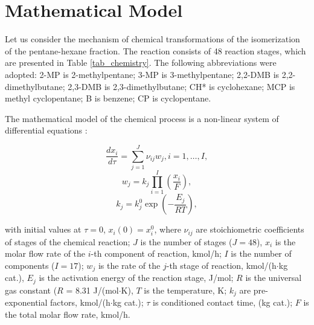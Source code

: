 \documentclass[mathematics,article,accept,pdftex,moreauthors]{Definitions/mdpi}
\begin{document}
	\section{Mathematical Model}\label{sec_matmodel}
	
	Let us consider the mechanism of chemical transformations of the isomerization of the pentane-hexane fraction. The reaction consists of 48 reaction stages, which are presented in Table \ref{tab_chemistry}. The following abbreviations were adopted: 2-MP is 2-methylpentane; 3-MP is 3-methylpentane; 2,2-DMB is 2,2-dimethylbutane; 2,3-DMB is 2,3-dimethylbutane; CH* is cyclohexane; MCP is methyl cyclopentane; B is benzene; CP is cyclopentane.
	
	The mathematical model of the chemical process is a non-linear system of differential equations \cite{enik2021,logan}:
	\begin{linenomath}
		\begin{equation}\label{eq_concentrations}
			\dfrac{dx_i}{d\tau} = \sum_{j=1}^J \nu_{ij} w_j, i = 1,\dots,I,
		\end{equation}
		\begin{equation}\label{eq_rate}
			w_{j} = k_j \prod_{i=1}^I \left( \dfrac{x_i}{F} \right),
		\end{equation}
		\begin{equation}\label{eq_constant}
			k_j = k^0_j \exp \left( -\dfrac{E_j}{RT} \right),
		\end{equation}
	\end{linenomath}
	with initial values at $\tau = 0$, $x_i(0) = x_i^0$, where $\nu_{ij}$ are stoichiometric coefficients of stages of the chemical reaction; $J$ is the number of stages ($J = 48$), $x_i$ is the molar flow rate of the $i$-th component of reaction, kmol/h; $I$ is the number of components ($I = 17$); $w_j$ is the rate of the $j$-th stage of reaction, kmol/(h$\cdot$kg cat.), $E_j$ is the activation energy of the reaction stage, J/mol; $R$ is the universal gas constant ($R$ = 8.31 J/(mol$\cdot$K), $T$ is the temperature, K; $k_j$ are pre-exponential factors, kmol/(h$\cdot$kg cat.); $\tau$ is conditioned contact time, (kg cat.); $F$ is the total molar flow rate, kmol/h.
	
\end{document}
